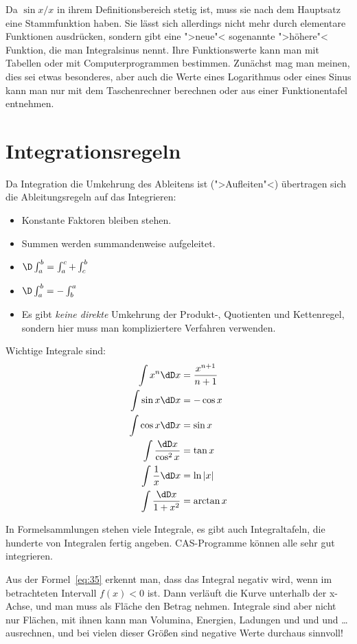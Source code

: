 Da $\sin x /x$ in ihrem Definitionsbereich stetig ist, muss sie nach dem
Hauptsatz eine Stammfunktion haben. Sie lässt sich allerdings nicht mehr durch
elementare Funktionen ausdrücken, sondern gibt eine ">neue"< sogenannte
">höhere"< Funktion, die man Integralsinus nennt. Ihre Funktionswerte kann man
mit Tabellen oder mit Computerprogrammen bestimmen. Zunächst mag man meinen,
dies sei etwas besonderes, aber auch die Werte eines Logarithmus oder eines
Sinus kann man nur mit dem Taschenrechner berechnen oder aus einer
Funktionentafel entnehmen.

\section{Integrationsregeln}

Da Integration die Umkehrung des Ableitens ist (">Aufleiten"<) übertragen sich
die Ableitungsregeln auf das Integrieren:
\begin{itemize}
\item Konstante Faktoren bleiben stehen.
\item Summen werden summandenweise aufgeleitet.
\item $\D\int_a^b=\int_a^c+\int_c^b$
\item $\D \int_a^b=-\int_b^a$
\item Es gibt \emph{keine direkte} Umkehrung der Produkt-, Quotienten und
  Kettenregel, sondern hier muss man kompliziertere Verfahren verwenden.
\end{itemize}

Wichtige Integrale sind:
\begin{align}
  \label{eq:36}
  \int x^n\dD x&=\frac{x^{n+1}}{n+1}\\
  \int\sin x\dD x&= -\cos x\label{eq:37}\\
  \int\cos x\dD x&= \sin x\label{eq:38}\\
  \int\frac{\dD x}{\cos^2x}&= \tan x\label{eq:39}\\
  \int\frac{1}{x}\dD x&= \ln|x|\label{eq:40}\\
  \int\frac{\dD x}{1+x^2}&= \arctan x\label{eq:41}
\end{align}

In Formelsammlungen stehen viele Integrale, es gibt auch Integraltafeln, die
hunderte von Integralen fertig angeben. CAS-Programme können alle sehr gut
integrieren.

Aus der Formel~\eqref{eq:35} erkennt man, dass das Integral negativ wird, wenn
im betrachteten Intervall $f(x)<0$ ist. Dann verläuft die Kurve unterhalb der
x-Achse, und man muss als Fläche den Betrag nehmen. Integrale sind aber nicht
nur Flächen, mit ihnen kann man Volumina, Energien, Ladungen und und und
\ldots ausrechnen, und bei vielen dieser Größen sind negative Werte durchaus
sinnvoll!

